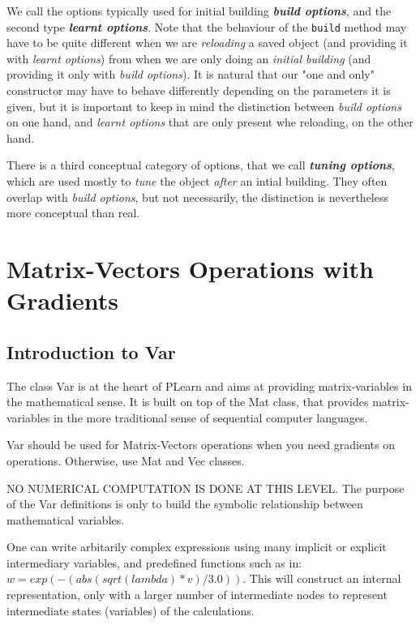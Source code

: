 \documentclass[11pt]{book}
\begin{document}
We call the options typically used for initial building {\em \bf build options}, and the second type {\em \bf learnt options}. Note that the behaviour of the {\tt build} method may have to be quite different when we are {\em reloading} a saved object (and providing it with {\em learnt options}) from when we are only doing an {\em initial building} (and providing it only with {\em build options}). It is natural that our "one and only" constructor may have to behave differently depending on the parameters it is given, but it is important to keep in mind the distinction between {\em build options} on one hand, and {\em learnt options} that are only present whe reloading, on the other hand.

There is a third conceptual category of options, that we call {\em \bf tuning options}, which are used mostly to {\em tune} the object {\em after} an intial building. They often overlap with {\em build options}, but not necessarily, the distinction is nevertheless more conceptual than real. 





\section{Matrix-Vectors Operations with Gradients}
\label{Var}

\subsection{Introduction to Var}

 The class Var is at the heart of PLearn and aims at providing matrix-variables in the mathematical sense. It is built on top of the Mat class, that provides matrix-variables in the more traditional sense of sequential computer languages.
 
 Var should be used for Matrix-Vectors operations when you need gradients on operations. Otherwise, use Mat and Vec classes.
 
 NO NUMERICAL COMPUTATION IS DONE AT THIS LEVEL. The purpose of the Var definitions is only to build the symbolic relationship between mathematical variables. 

 One can write arbitarily complex expressions using many implicit or
explicit intermediary variables, and predefined functions such as
in: $w=exp(-(abs(sqrt(lambda)*v)/3.0))$.  This will construct an
internal representation, only with a larger number of intermediate
nodes to represent intermediate states (variables) of the calculations.
\end{document}
